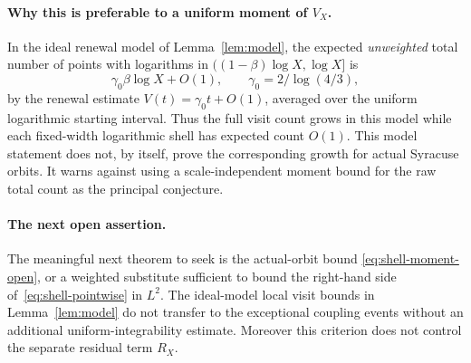 \paragraph{Why this is preferable to a uniform moment of $V_X$.}
In the ideal renewal model of Lemma~\ref{lem:model}, the expected
\emph{unweighted} total number of points with logarithms in
$((1-\beta)\log X,\log X]$ is
\[
 \gamma_0\beta\log X+O(1),\qquad
 \gamma_0=2/\log(4/3),
\]
by the renewal estimate $V(t)=\gamma_0t+O(1)$, averaged over the
uniform logarithmic starting interval. Thus the full visit count grows
in this model while each fixed-width logarithmic shell has expected
count $O(1)$. This model statement does not, by itself, prove the
corresponding growth for actual Syracuse orbits. It warns against
using a scale-independent moment bound for the raw total count as the
principal conjecture.

\paragraph{The next open assertion.}
The meaningful next theorem to seek is the actual-orbit bound
\eqref{eq:shell-moment-open}, or a weighted substitute sufficient to
bound the right-hand side of~\eqref{eq:shell-pointwise} in $L^2$.
The ideal-model local visit bounds in Lemma~\ref{lem:model} do not
transfer to the exceptional coupling events without an additional
uniform-integrability estimate. Moreover this criterion does not
control the separate residual term $R_X$.
